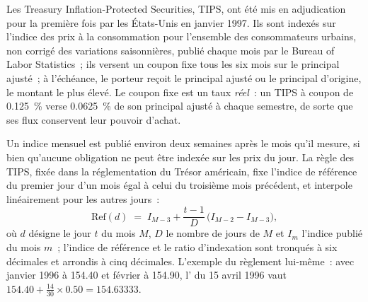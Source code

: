 Les Treasury Inflation-Protected Securities, TIPS, ont été mis en adjudication pour la
première fois par les États-Unis en janvier 1997. Ils sont indexés sur l'indice des prix à la
consommation pour l'ensemble des consommateurs urbains, non corrigé des variations saisonnières, publié chaque mois par le
Bureau of Labor Statistics~; ils versent un coupon fixe tous les six mois sur le
principal ajusté~; à l'échéance, le porteur reçoit le principal ajusté ou le principal d'origine,
le montant le plus élevé. Le coupon fixe est un taux \emph{réel}~:
un TIPS à coupon de 0.125~\% verse 0.0625~\% de son principal ajusté à chaque semestre,
de sorte que ses flux conservent leur pouvoir d'achat.

Un indice mensuel est publié environ deux semaines après le mois qu'il mesure, si bien qu'aucune
obligation ne peut être indexée sur les prix du jour. La règle des TIPS, fixée dans la
réglementation du Trésor américain, fixe l'indice de référence du premier jour d'un mois égal à
celui du troisième mois précédent, et interpole linéairement pour les
autres jours~:
\begin{equation}\label{eq:m2:inflation-markets:refcpi}
\mathrm{Ref}(d) \;=\; I_{M-3} + \frac{t-1}{D}\,\bigl(I_{M-2} - I_{M-3}\bigr),
\end{equation}
où $d$ désigne le jour $t$ du mois $M$, $D$ le nombre de jours de $M$ et $I_m$
l'indice publié du mois $m$~; l'indice de référence et le ratio d'indexation sont
tronqués à six décimales et arrondis à cinq décimales. L'exemple du règlement lui-même~:
avec janvier 1996 à 154.40 et février à 154.90, l' du 15
avril 1996 vaut $154.40 + \tfrac{14}{30}\times 0.50 = 154.63333$.

